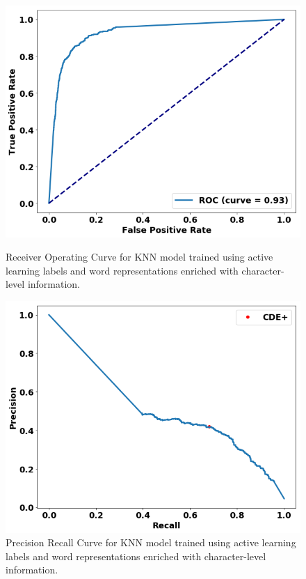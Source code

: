 \begin{figure}[H]
\centering
\begin{minipage}[b]{.4\textwidth}
\includegraphics[trim=0in 0.1in 0.1in 0.in,clip,width=1.0\textwidth]{figures/fasttext_roc_al_corpus_round5_100}
\caption{Receiver Operating Curve for KNN model trained using active learning labels and word representations enriched with character-level information.}\label{fig:al1_rocs_fasttext}
\end{minipage}\qquad
\begin{minipage}[b]{.4\textwidth}
\includegraphics[trim=0in 0.1in 0.1in 0.in,clip,width=1.0\textwidth]{figures/fasttext_prc_al_corpus_round5_100}
\caption{Precision Recall Curve for KNN model trained using active learning labels and word representations enriched with character-level information.}\label{fig:al1_prcs_fasttext}
\end{minipage}
\end{figure}











